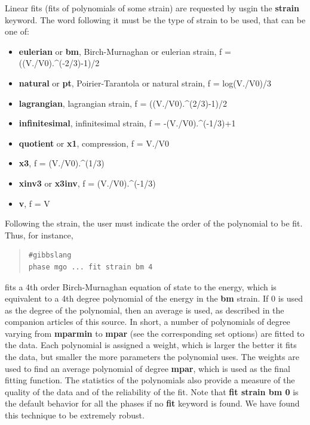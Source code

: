 \documentclass[a4paper]{article}
\begin{document}
\begin{itemize}
Linear fits (fits of polynomials of some strain) are requested by
usgin the \textbf{strain} keyword. The word following it must be the
type of strain to be used, that can be one of:
%
\begin{itemize}

\item \textbf{eulerian} or \textbf{bm}, Birch-Murnaghan or eulerian strain,
f = ((V./V0).\textasciicircum{}(-2/3)-1)/2

\item \textbf{natural} or \textbf{pt}, Poirier-Tarantola or natural strain,
f = log(V./V0)/3

\item \textbf{lagrangian}, lagrangian strain, f = ((V./V0).\textasciicircum{}(2/3)-1)/2

\item \textbf{infinitesimal}, infinitesimal strain, f = -(V./V0).\textasciicircum{}(-1/3)+1

\item \textbf{quotient} or \textbf{x1}, compression, f = V./V0

\item \textbf{x3}, f = (V./V0).\textasciicircum{}(1/3)

\item \textbf{xinv3} or \textbf{x3inv}, f = (V./V0).\textasciicircum{}(-1/3)

\item \textbf{v}, f = V

\end{itemize}

Following the strain, the user must indicate the order of the
polynomial to be fit. Thus, for instance,
%
\begin{quote}
\begin{verbatim}
#gibbslang
phase mgo ... fit strain bm 4
\end{verbatim}
\end{quote}

fits a 4th order Birch-Murnaghan equation of state to the energy,
which is equivalent to a 4th degree polynomial of the energy in the
\textbf{bm} strain. If 0 is used as the degree of the polynomial, then
an average is used, as described in the companion articles of this
source. In short, a number of polynomials of degree varying from
\textbf{mparmin} to \textbf{mpar} (see the corresponding set options) are
fitted to the data. Each polynomial is assigned a weight, which is
larger the better it fits the data, but smaller the more parameters
the polynomial uses. The weights are used to find an average
polynomial of degree \textbf{mpar}, which is used as the final fitting
function. The statistics of the polynomials also provide a measure
of the quality of the data and of the reliability of the fit. Note
that \textbf{fit strain bm 0} is the default behavior for all the phases
if no \textbf{fit} keyword is found. We have found this technique to be
extremely robust.


\end{itemize}
\end{document}
